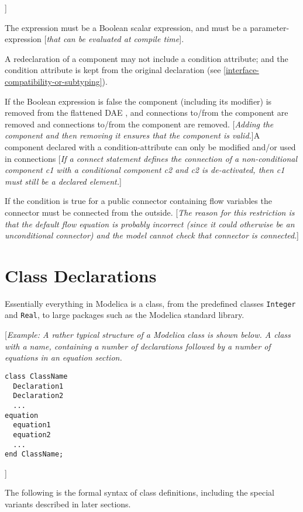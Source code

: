 {]}

The expression must be a Boolean scalar expression, and must be a
parameter-expression {[}\emph{that can be evaluated at compile time}{]}.

A redeclaration of a component may not include a condition attribute;
and the condition attribute is kept from the original declaration (see
\autoref{interface-compatibility-or-subtyping}).

If the Boolean expression is false the component (including its
modifier) is removed from the flattened DAE , and connections to/from
the component are removed and connections to/from the component are
removed. {[}\emph{Adding the component and then removing it ensures that
the component is valid.}{]}A component declared with a
condition-attribute can only be modified and/or used in connections
{[}\emph{If a connect statement defines the connection of a
non-conditional component c1 with a conditional component c2 and c2 is
de-activated, then c1 must still be a declared element.}{]}

If the condition is true for a public connector containing flow
variables the connector must be connected from the outside. {[}\emph{The
reason for this restriction is that the default flow equation is
probably incorrect (since it could otherwise be an unconditional
connector) and the model cannot check that connector is connected}.{]}

\section{Class Declarations}

Essentially everything in Modelica is a class, from the predefined
classes \lstinline!Integer! and \lstinline!Real!, to large packages such as the Modelica
standard library.

{[}\emph{Example: A rather typical structure of a Modelica class is
shown below. A class with a name, containing a number of declarations
followed by a number of equations in an equation section.}

\begin{lstlisting}[language=modelica]
class ClassName
  Declaration1
  Declaration2
  ...
equation
  equation1
  equation2
  ...
end ClassName;
\end{lstlisting}

{]}

The following is the formal syntax of class definitions, including the
special variants described in later sections.

